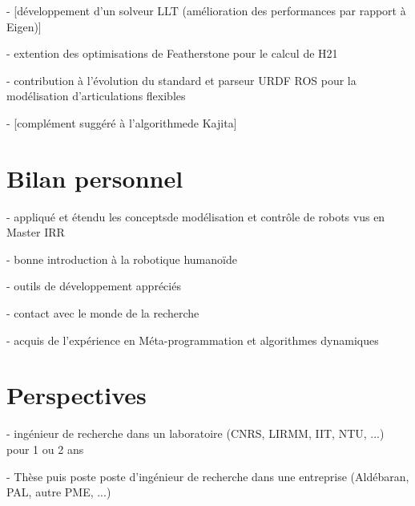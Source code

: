 \documentclass{report}
\begin{document}
- [développement d'un solveur LLT (amélioration des performances par rapport à Eigen)]

- extention des optimisations de Featherstone pour le calcul de H21

- contribution à l'évolution du standard et parseur URDF ROS pour la modélisation d'articulations flexibles

- [complément suggéré à l'algorithmede Kajita]


\section*{Bilan personnel}

- appliqué et étendu les conceptsde modélisation et contrôle de robots vus en Master IRR

- bonne introduction à la robotique humanoïde

- outils de développement appréciés

- contact avec le monde de la recherche

- acquis de l'expérience en Méta-programmation et algorithmes dynamiques


\section*{Perspectives}

- ingénieur de recherche dans un laboratoire (CNRS, LIRMM, IIT, NTU, ...) pour 1 ou 2 ans

- Thèse puis poste poste d'ingénieur de recherche dans une entreprise (Aldébaran, PAL, autre PME, ...)



\appendix




\clearpage
{}

\end{document}
